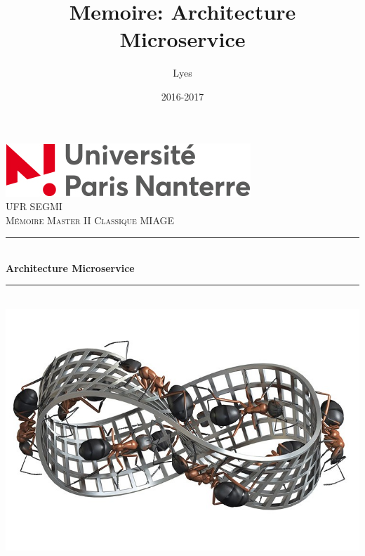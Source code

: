 \documentclass[12pt, a4paper, openany]{report}
\title{Memoire: Architecture Microservice}
\author{Lyes \bsc{Kherbiche}}
\date{2016-2017}
\newcommand{\HRule}{\rule{\linewidth}{0.5mm}}
\begin{document}

\makeatletter
  \begin{titlepage}
  
      
      
      
      
  \begin{sffamily}
   \begin{center}

    \includegraphics[scale=0.5]{parisx.jpg}~\\[1.5cm]

    \textsc{\LARGE UFR SEGMI }\\[2cm]

    \textsc{\Large Mémoire Master II Classique MIAGE}\\[1.5cm]

    \HRule \\[0.4cm]
    { \huge \bfseries Architecture Microservice\\[0.4cm] }

    \HRule \\[2cm]
    \includegraphics[scale=0.3]{fourmies.jpg}
    \\[2cm]


\end{center}
\end{sffamily}
\end{titlepage}
\end{document}
